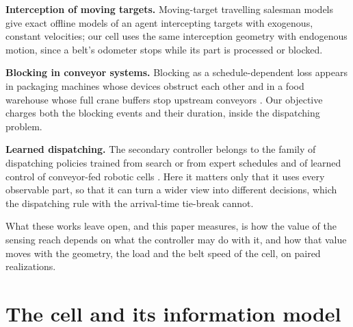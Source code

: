 \documentclass[11pt,a4paper]{article}
\begin{document}
\textbf{Interception of moving targets.} Moving-target travelling salesman models
\cite{S06_Helvig2003,S07_Stieber2022,S08_Philip2024} give exact offline models of an agent
intercepting targets with exogenous, constant velocities; our cell uses the same
interception geometry with endogenous motion, since a belt's odometer stops while its part
is processed or blocked.

\textbf{Blocking in conveyor systems.} Blocking as a schedule-dependent loss appears in
packaging machines whose devices obstruct each other \cite{S10_Briskorn2025} and in a food
warehouse whose full crane buffers stop upstream conveyors \cite{S11_SalviaHornos2026}.
Our objective charges both the blocking events and their duration, inside the dispatching
problem.

\textbf{Learned dispatching.} The secondary controller belongs to the family of
dispatching policies trained from search or from expert schedules
\cite{M02_Bertsekas1997,S19_Zhang2020,S21_Sun2023,S20_VanRemmerden2025,M04_Huang2022,S18_Wei2024}
and of learned control of conveyor-fed robotic cells
\cite{S15_Zisgen2025,S16_Drijver2023,S17_Drakaki2017,S12_Wang2004,S13_Li2020}. Here it
matters only that it uses every observable part, so that it can turn a wider view into
different decisions, which the dispatching rule with the arrival-time tie-break cannot.

What these works leave open, and this paper measures, is how the value of the sensing
reach depends on what the controller may do with it, and how that value moves with the
geometry, the load and the belt speed of the cell, on paired realizations.

\section{The cell and its information model}\label{sec:cell}
\end{document}
